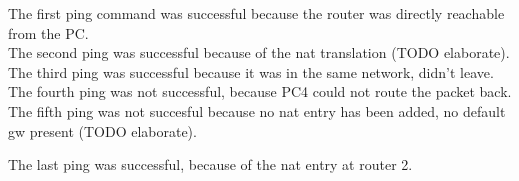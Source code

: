 
The first ping command was successful because the router was directly reachable from the PC. \\
The second ping was successful because of the nat translation (TODO elaborate).
The third ping was successful because it was in the same network, didn't leave.
The fourth ping was not successful, because PC4 could not route the packet back.
The fifth ping was not succesful because no nat entry has been added, no default gw present (TODO elaborate).

The last ping was successful, because of the nat entry at router 2.